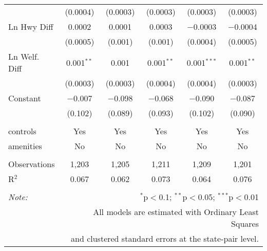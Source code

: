 \begin{table}[!htbp]
\begin{tabular}{@{\extracolsep{5pt}}lccccc}
  & (0.0004) & (0.0003) & (0.0003) & (0.0003) & (0.0003) \\ 
  Ln Hwy Diff & 0.0002 & 0.0001 & 0.0003 & $-$0.0003 & $-$0.0004 \\ 
  & (0.0005) & (0.001) & (0.001) & (0.0004) & (0.0005) \\ 
  Ln Welf. Diff & 0.001$^{**}$ & 0.001 & 0.001$^{**}$ & 0.001$^{***}$ & 0.001$^{**}$ \\ 
  & (0.0003) & (0.0003) & (0.0004) & (0.0004) & (0.0003) \\ 
  Constant & $-$0.007 & $-$0.098 & $-$0.068 & $-$0.090 & $-$0.087 \\ 
  & (0.102) & (0.089) & (0.093) & (0.102) & (0.090) \\ 
 \hline \\[-1.8ex] 
controls & Yes & Yes & Yes & Yes & Yes \\ 
amenities & No & No & No & No & No \\ 
\hline \\[-1.8ex] 
Observations & 1,203 & 1,205 & 1,211 & 1,209 & 1,201 \\ 
R$^{2}$ & 0.067 & 0.062 & 0.073 & 0.064 & 0.076 \\ 
\hline 
\hline \\[-1.8ex] 
\textit{Note:}  & \multicolumn{5}{r}{$^{*}$p$<$0.1; $^{**}$p$<$0.05; $^{***}$p$<$0.01} \\ 
 & \multicolumn{5}{r}{All models are estimated with Ordinary Least Squares} \\ 
 & \multicolumn{5}{r}{and clustered standard errors at the state-pair level.} \\ 
\end{tabular} 
\end{table} 

